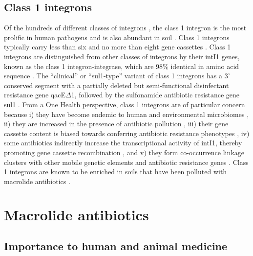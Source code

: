 \subsection{Class 1 integrons}

Of the hundreds of different classes of integrons \parencite{Abella.2015}, the class 1 integron is the most prolific in human pathogens and is also abundant in soil \parencite{Dawes.2010, RuizMartinez.2011, Gillings.2018}.
Class 1 integrons typically carry less than six and no more than eight gene cassettes \parencite{Gillings.2014, Naas.2001}.
Class 1 integrons are distinguished from other classes of integrons by their intI1 genes, known as the class 1 integron-integrase, which are 98\% identical in amino acid sequence \parencite{Roy.2021}.
The “clinical” or “sul1-type” variant of class 1 integrons has a 3’ conserved segment with a partially deleted but semi-functional disinfectant resistance gene qacE${\Delta}$1, followed by the sulfonamide antibiotic resistance gene sul1 \dummyfig \parencite{Partridge.2018}.
From a One Health perspective, class 1 integrons are of particular concern because i) they have become endemic to human and environmental microbiomes \parencite{Gillings.2017}, ii) they are increased in the presence of antibiotic pollution \parencite{Gillings.2017, Wright.2008, Stalder.2014}, iii) their gene cassette content is biased towards conferring antibiotic resistance phenotypes \parencite{Yang.2021}, iv) some antibiotics indirectly increase the transcriptional activity of intI1, thereby promoting gene cassette recombination \parencite{Baharoglu.2010}, and v) they form co-occurrence linkage clusters with other mobile genetic elements and antibiotic resistance genes \parencite{Pal.2015}.
Class 1 integrons are known to be enriched in soils that have been polluted with macrolide antibiotics \parencite{Lau.2020}.

\section{Macrolide antibiotics}

\subsection{Importance to human and animal medicine}

